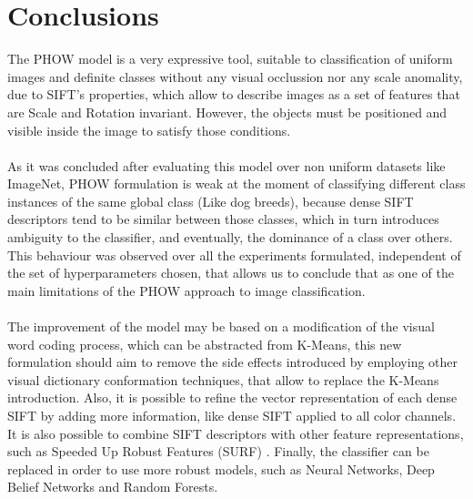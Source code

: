 \documentclass[10pt,twocolumn,letterpaper]{article}
\begin{document}
\section{Conclusions}
The PHOW model is a very expressive tool, suitable to classification of uniform images and definite classes without any visual occlussion nor any scale anomality, due to SIFT's properties, which allow to describe images as a set of features that are Scale and Rotation invariant. However, the objects must be positioned and visible inside the image to satisfy those conditions.
\\
\\
As it was concluded after evaluating this model over non uniform datasets like ImageNet, PHOW formulation is weak at the moment of classifying different class instances of the same global class (Like dog breeds), because dense SIFT descriptors tend to be similar between those classes, which in turn introduces ambiguity to the classifier, and eventually, the dominance of a class over others. This behaviour was observed over all the experiments formulated, independent of the set of hyperparameters chosen, that allows us to conclude that as one of the main limitations of the PHOW approach to image classification.
\\
\\
The improvement of the model may be based on a modification of the visual word coding process, which can be abstracted from K-Means, this new formulation should aim to remove the side effects introduced by employing other visual dictionary conformation techniques, that allow to replace the K-Means introduction. Also, it is possible to refine the vector representation of each dense SIFT by adding more information, like dense SIFT applied to all color channels. It is also possible to combine SIFT descriptors with other feature representations, such as Speeded Up Robust Features (SURF) \cite{bay2006surf}. Finally, the classifier can be replaced in order to use more robust models, such as Neural Networks, Deep Belief Networks and Random Forests. 


{\small


}
\end{document}
